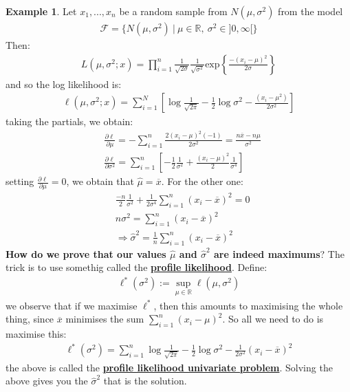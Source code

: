 \documentclass[11pt]{scrartcl}
\newcommand{\R}[0]{\mathbb{R}}
\theoremstyle{definition}
\newtheorem{ex}{Example}
\theoremstyle{remark}
\newcommand{\dfn}[1]{\textbf{\underline{#1}}}
\newcommand{\dist}[0]{\mathcal{F}}
\begin{document}
\begin{ex} 
	Let $x_1, ..., x_n$ be a random sample from $N(\mu, \sigma^2)$ from the model
	\begin{align*}
		\dist = \{ N(\mu, \sigma^2)\ |\ \mu \in \R,\ \sigma^2 \in ]0, \infty[ \} 	
	\end{align*}
	Then: 
	\begin{align*}
		L(\mu, \sigma^2; x) = \prod_{i=1}^n \frac{1}{\sqrt{ 2 \sigma}} \frac{1}{\sqrt{\sigma^2} } \text{exp} \left\{ \frac{-(x_i - \mu)^2}{2 \sigma}		\right\} 	
	\end{align*}
	and so the log likelihood is: 
	\begin{align*}
		\ell(\mu, \sigma^2; x ) = \sum_{i=1}^N \left[ \log \frac{1}{\sqrt{2 \pi}} - \frac{1}{2} \log \sigma^2 - \frac{(x_i - \mu^2)}{2 \sigma^2}	\right] 
	\end{align*}
	taking the partials, we obtain: 
	\begin{align*}
		& \frac{\partial \ell}{\partial \mu} = - \sum_{i=1}^n \frac{2 (x_i -  \mu)^2 (-1)}{2 \sigma^2}	 = \frac{n \overline{x} - n \mu}{\sigma^2} \\
		& \frac{\partial \ell}{\partial \sigma^2} = \sum_{i=1}^n \left[ 		-\frac{1}{2} \frac{1}{\sigma^2} + \frac{(x_i - \mu)^2}{2} \frac{1}{\sigma^4} \right] 
	\end{align*}
	setting $\frac{\partial \ell}{\partial \mu} =0$, we obtain that $\hat{\mu} = \overline{x}$. For the other one: 
	\begin{align*}
		& \frac{-n}{2} \frac{1}{\sigma^2} + \frac{1}{2 \sigma^4} \sum_{i=1}^n (x_i - \overline{x} )^2 = 0  \\
		& n \sigma^2 = \sum_{i=1}^n (x_i - \overline{x})^2 \\
		& \Rightarrow \hat{\sigma}^2 = \frac{1}{n} \sum_{i=1}^n (x_i - \overline{x})^2		
	\end{align*}
	\textbf{How do we prove that our values $\hat{\mu}$ and $\hat{\sigma}^2$ are indeed maximums}? The trick is to use somethig called the \dfn{profile likelihood}. Define: 
	\begin{align}
		\ell^*(\sigma^2) := \sup_{\mu \in \R} \ell (\mu, \sigma^2) 
	\end{align}
	we observe that if we maximise $\ell^*$, then this amounts to maximising the whole thing, since $\overline{x}$ minimises the sum $\sum_{i=1}^n (x_i - \mu)^2$. So all we need to do is maximise this:
	\begin{align*}
			\ell^*(\sigma^2) = \sum_{i=1}^n \log \frac{1}{\sqrt{2 \pi}} - \frac{1}{2} \log \sigma^2 - \frac{1}{2 \sigma^2} (x_i - \overline{x})^2
	\end{align*}
 	the above is called the \dfn{profile likelihood univariate problem}. Solving the above gives you the $\hat{\sigma}^2$ that is the solution. 
\end{ex}
\end{document}
